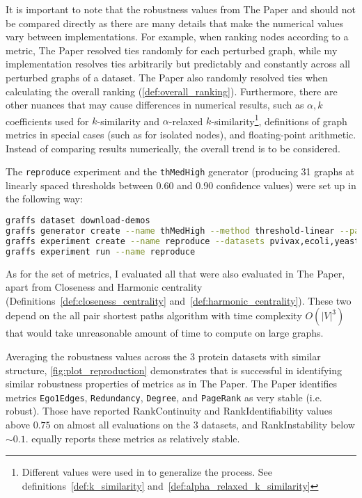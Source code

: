 \label{para:how_to_compare_results}
It is important to note that the robustness values from The Paper and \graffs should not be compared directly as there are many details that make the numerical values vary between implementations.
For example, when ranking nodes according to a metric, The Paper resolved ties randomly for each perturbed graph, while my implementation resolves ties arbitrarily but predictably and constantly across all perturbed graphs of a dataset.
The Paper also randomly resolved ties when calculating the overall ranking (\autoref{def:overall_ranking}).
Furthermore, there are other nuances that may cause differences in numerical results, such as $\alpha,k$ coefficients used for $k$-similarity and $\alpha$-relaxed $k$-similarity\footnote{Different values were used in \graffs to generalize the process. See definitions~\ref{def:k_similarity} and~\ref{def:alpha_relaxed_k_similarity}}, definitions of graph metrics in special cases (such as for isolated nodes), and floating-point arithmetic.
Instead of comparing results numerically, the overall trend is to be considered.

The \texttt{reproduce} experiment and the \texttt{thMedHigh} generator (producing 31 graphs at linearly spaced thresholds between 0.60 and 0.90 confidence values) were set up in the following way:
\begin{lstlisting}[language=bash]
graffs dataset download-demos
graffs generator create --name thMedHigh --method threshold-linear --params 600,900 -n 31 --seed 7
graffs experiment create --name reproduce --datasets pvivax,ecoli,yeast --generator thMedHigh --metrics Betweenness,Degree,Ego1Edges,Ego2Nodes,LocalClustering,PageRank,Redundancy --robustnessMeasures RankIdentifiability,RankInstability,RankContinuity
graffs experiment run --name reproduce
\end{lstlisting}

As for the set of metrics, I evaluated all that were also evaluated in The Paper, apart from Closeness and Harmonic centrality (Definitions~\ref{def:closeness_centrality} and~\ref{def:harmonic_centrality}).
These two depend on the all pair shortest paths algorithm with time complexity $O({\left\lvert V \right\rvert}^3)$ that would take unreasonable amount of time to compute on large graphs.



Averaging the robustness values across the 3 protein datasets with similar structure, \autoref{fig:plot_reproduction} demonstrates that \graffs is successful in identifying similar robustness properties of metrics as in The Paper.
The Paper identifies metrics \texttt{Ego1Edges}, \texttt{Redundancy}, \texttt{Degree}, and \texttt{PageRank} as very stable (i.e. robust).
Those have reported RankContinuity and RankIdentifiability values above $0.75$ on almost all evaluations on the 3 datasets, and RankInstability below $\sim 0.1$.
\graffs equally reports these metrics as relatively stable.

